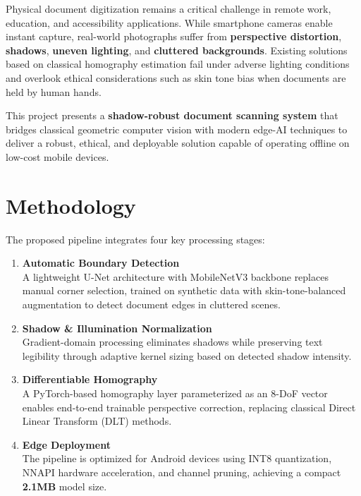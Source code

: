 \documentclass[11pt,a4paper]{article}
\begin{document}
\begin{tcolorbox}
Physical document digitization remains a critical challenge in remote work, education, and accessibility applications. While smartphone cameras enable instant capture, real-world photographs suffer from \textbf{perspective distortion}, \textbf{shadows}, \textbf{uneven lighting}, and \textbf{cluttered backgrounds}. Existing solutions based on classical homography estimation fail under adverse lighting conditions and overlook ethical considerations such as skin tone bias when documents are held by human hands.

\vspace{0.3cm}

This project presents a \textbf{shadow-robust document scanning system} that bridges classical geometric computer vision with modern edge-AI techniques to deliver a robust, ethical, and deployable solution capable of operating offline on low-cost mobile devices.
\end{tcolorbox}

\vspace{0.8cm}

\section{Methodology}

The proposed pipeline integrates four key processing stages:

\vspace{0.3cm}

\begin{enumerate}[leftmargin=*, itemsep=0.4cm]
    \item \textbf{\color{primaryblue}Automatic Boundary Detection}\\
    A lightweight U-Net architecture with MobileNetV3 backbone replaces manual corner selection, trained on synthetic data with skin-tone-balanced augmentation to detect document edges in cluttered scenes.
    
    \item \textbf{\color{primaryblue}Shadow \& Illumination Normalization}\\
    Gradient-domain processing eliminates shadows while preserving text legibility through adaptive kernel sizing based on detected shadow intensity.
    
    \item \textbf{\color{primaryblue}Differentiable Homography}\\
    A PyTorch-based homography layer parameterized as an 8-DoF vector enables end-to-end trainable perspective correction, replacing classical Direct Linear Transform (DLT) methods.
    
    \item \textbf{\color{primaryblue}Edge Deployment}\\
    The pipeline is optimized for Android devices using INT8 quantization, NNAPI hardware acceleration, and channel pruning, achieving a compact \textbf{2.1MB} model size.
\end{enumerate}
\end{document}
